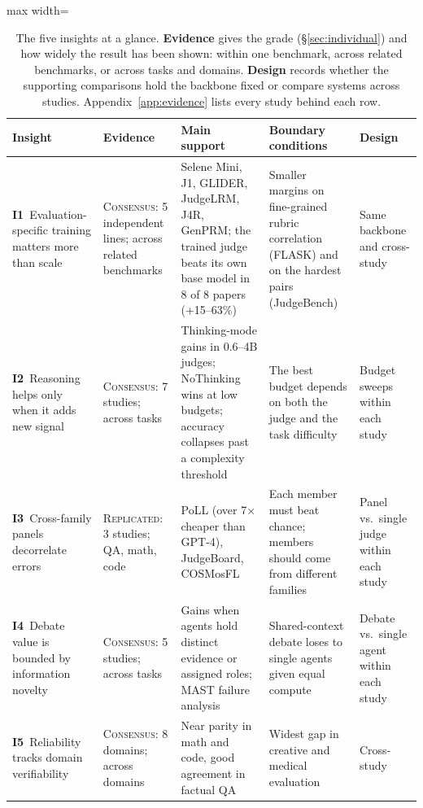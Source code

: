 
\begin{table}[t]
\centering
\small
\begin{adjustbox}{max width=\textwidth}
\prettytable
\begin{tabular}{@{}>{\raggedright\arraybackslash}p{3.2cm}>{\raggedright\arraybackslash}p{2.5cm}>{\raggedright\arraybackslash}p{4.6cm}>{\raggedright\arraybackslash}p{3.9cm}>{\raggedright\arraybackslash}p{2.2cm}@{}}
\toprule
\textbf{Insight} & \textbf{Evidence} & \textbf{Main support} & \textbf{Boundary conditions} & \textbf{Design} \\
\midrule
\textbf{I1}~Evaluation-specific training matters more than scale & \textsc{Consensus}: 5 independent lines; across related benchmarks & Selene Mini, J1, GLIDER, JudgeLRM, J4R, GenPRM; the trained judge beats its own base model in 8 of 8 papers (+15--63\%) & Smaller margins on fine-grained rubric correlation (FLASK) and on the hardest pairs (JudgeBench) & Same backbone and cross-study \\
\textbf{I2}~Reasoning helps only when it adds new signal & \textsc{Consensus}: 7 studies; across tasks & Thinking-mode gains in 0.6--4B judges; NoThinking wins at low budgets; accuracy collapses past a complexity threshold & The best budget depends on both the judge and the task difficulty & Budget sweeps within each study \\
\textbf{I3}~Cross-family panels decorrelate errors & \textsc{Replicated}: 3 studies; QA, math, code & PoLL (over 7$\times$ cheaper than GPT-4), JudgeBoard, COSMosFL & Each member must beat chance; members should come from different families & Panel vs.\ single judge within each study \\
\textbf{I4}~Debate value is bounded by information novelty & \textsc{Consensus}: 5 studies; across tasks & Gains when agents hold distinct evidence or assigned roles; MAST failure analysis & Shared-context debate loses to single agents given equal compute & Debate vs.\ single agent within each study \\
\textbf{I5}~Reliability tracks domain verifiability & \textsc{Consensus}: 8 domains; across domains & Near parity in math and code, good agreement in factual QA & Widest gap in creative and medical evaluation & Cross-study \\
\bottomrule
\end{tabular}
\end{adjustbox}
\caption{The five insights at a glance. \textbf{Evidence} gives the grade (\S\ref{sec:individual}) and how widely the result has been shown: within one benchmark, across related benchmarks, or across tasks and domains. \textbf{Design} records whether the supporting comparisons hold the backbone fixed or compare systems across studies. Appendix~\ref{app:evidence} lists every study behind each row.}
\label{tab:insights}
\end{table}
